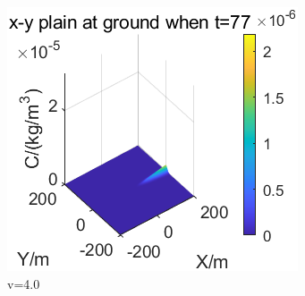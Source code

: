 \documentclass{article}
\begin{document}
\begin{figure}[htbp]
\begin{minipage}{0.33\textwidth}
		\end{minipage}
		\begin{minipage}{0.33\textwidth}
			\includegraphics[width=\textwidth]{pics/v=4,t=77.7.png}
		\end{minipage}
		\caption{v=4.0}
		\label{fig18}
	\end{figure}
\end{document}
